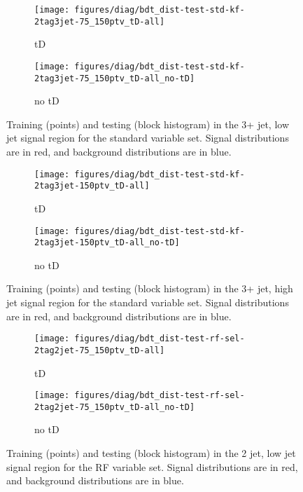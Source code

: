{\begin{figure}[!htbp]\captionsetup{justification=centering}
  \centering
  \begin{subfigure}[t]{0.49\textwidth}\centering\texttt{[image: figures/diag/bdt\_dist-test-std-kf-2tag3jet-75\_150ptv\_tD-all]}\caption{tD}\end{subfigure}
  \begin{subfigure}[t]{0.49\textwidth}\centering\texttt{[image: figures/diag/bdt\_dist-test-std-kf-2tag3jet-75\_150ptv\_tD-all\_no-tD]}\caption{no tD}\end{subfigure}
  \caption{Training (points) and testing (block histogram) in the 3+ jet, low jet signal region for the standard variable set.  Signal distributions are in red, and background distributions are in blue.}
  \label{fig:std-kf3jet-75_150ptv-testing}
\end{figure}

\begin{figure}[!htbp]\captionsetup{justification=centering}
  \centering
  \begin{subfigure}[t]{0.49\textwidth}\centering\texttt{[image: figures/diag/bdt\_dist-test-std-kf-2tag3jet-150ptv\_tD-all]}\caption{tD}\end{subfigure}
  \begin{subfigure}[t]{0.49\textwidth}\centering\texttt{[image: figures/diag/bdt\_dist-test-std-kf-2tag3jet-150ptv\_tD-all\_no-tD]}\caption{no tD}\end{subfigure}
  \caption{Training (points) and testing (block histogram) in the 3+ jet, high jet signal region for the standard variable set.  Signal distributions are in red, and background distributions are in blue.}
  \label{fig:std-kf3jet-150ptv-testing}
\end{figure}

\begin{figure}[!htbp]\captionsetup{justification=centering}
  \centering
  \begin{subfigure}[t]{0.49\textwidth}\centering\texttt{[image: figures/diag/bdt\_dist-test-rf-sel-2tag2jet-75\_150ptv\_tD-all]}\caption{tD}\end{subfigure}
  \begin{subfigure}[t]{0.49\textwidth}\centering\texttt{[image: figures/diag/bdt\_dist-test-rf-sel-2tag2jet-75\_150ptv\_tD-all\_no-tD]}\caption{no tD}\end{subfigure}
  \caption{Training (points) and testing (block histogram) in the 2 jet, low jet signal region for the RF variable set.  Signal distributions are in red, and background distributions are in blue.}
  \label{fig:rf-sel2jet-75_150ptv-testing}
\end{figure}

}

